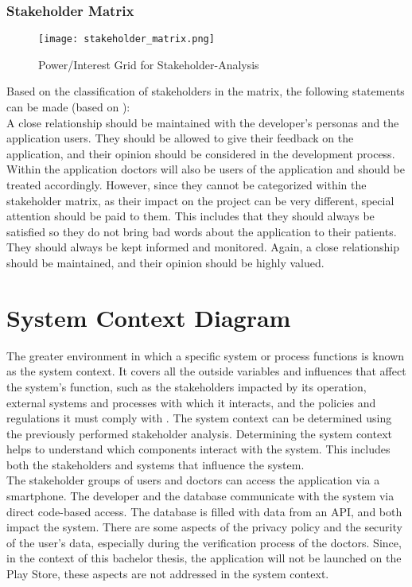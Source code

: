 \subsubsection{Stakeholder Matrix}
\begin{figure}[H]
	\centering
	\texttt{[image: stakeholder\_matrix.png]}
	\caption[Power/Interest Grid for Stakeholder-Analysis ]{Power/Interest Grid for Stakeholder-Analysis}
\end{figure}
\noindent	
Based on the classification of stakeholders in the matrix, the following statements can be made (based on \cite{.stakes}):
\newline \\
A close relationship should be maintained with the developer's personas and the application users. They should be allowed to give their feedback on the application, and their opinion should be considered in the development process.
\newline \\ 
Within the application doctors will also be users of the application and should be treated accordingly. However, since they cannot be categorized within the stakeholder matrix, as their impact on the project can be very different, special attention should be paid to them. This includes that they should always be satisfied so they do not bring bad words about the application to their patients. They should always be kept informed and monitored. Again, a close relationship should be maintained, and their opinion should be highly valued.

\section{System Context Diagram}
The greater environment in which a specific system or process functions is known as the system context. It covers all the outside variables and influences that affect the system's function, such as the stakeholders impacted by its operation, external systems and processes with which it interacts, and the policies and regulations it must comply with \cite{.systemcontext}. The system context can be determined using the previously performed stakeholder analysis. Determining the system context helps to understand which components interact with the system. This includes both the stakeholders and systems that influence the system.
\newline \\
The stakeholder groups of users and doctors can access the application via a smartphone. The developer and the database communicate with the system via direct code-based access. The database is filled with data from an API, and both impact the system. There are some aspects of the privacy policy and the security of the user's data, especially during the verification process of the doctors. Since, in the context of this bachelor thesis, the application will not be launched on the Play Store, these aspects are not addressed in the system context.


